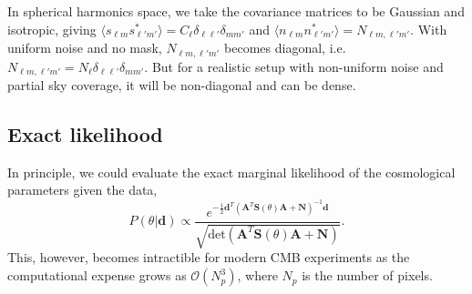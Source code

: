 \documentclass[twocolumn]{../common/aa}
\begin{document}
In spherical harmonics space, we take the covariance matrices to be Gaussian and isotropic, giving $\langle s_{\ell m}s_{\ell' m'}^* \rangle = C_{\ell} \delta_{\ell \ell'}\delta_{mm'}$ and $\langle n_{\ell m}n_{\ell' m'}^* \rangle = N_{\ell m, \ell' m'}$. With uniform noise and no mask, $N_{\ell m, \ell' m'} $ becomes diagonal, i.e. $N_{\ell m, \ell' m'} = N_\ell \delta_{\ell \ell'}\delta_{mm'}$. But for a realistic setup with non-uniform noise and partial sky coverage, it will be non-diagonal and can be dense.

\subsection{Exact likelihood}
\label{sec:exact-likelihood}

In principle, we could evaluate the exact marginal likelihood of the cosmological parameters given the data, 
\begin{equation}
    P(\theta | \textbf{d}) \propto \frac{e^{-\frac12 \textbf{d}^T (\textbf{A}^T \textbf{S}(\theta) \textbf{A} + \textbf{N})^{-1}\textbf{d}}}{\sqrt{\text{det}\left(\textbf{A}^T \textbf{S}(\theta) \textbf{A} + \textbf{N}\right)}}.
\end{equation}
This, however, becomes intractible for modern CMB experiments as the computational expense grows as $\mathcal{O}(N_p^3)$, where $N_p$ is the number of pixels.
\end{document}
